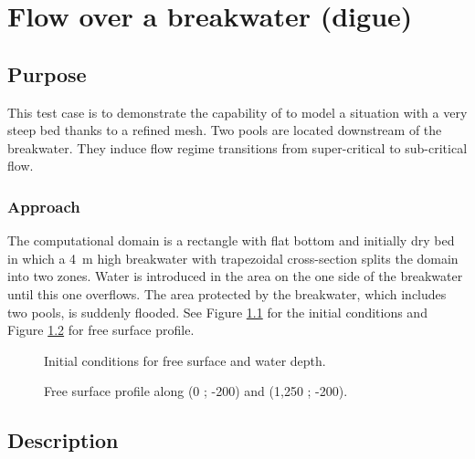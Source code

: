 \chapter{Flow over a breakwater (digue)}

\section{Purpose}

This test case is to demonstrate the capability of 
to model a situation with a very steep bed thanks to a refined 
mesh.
Two pools are located downstream of the breakwater.
They induce flow regime transitions from super-critical to sub-critical flow.

\subsection{Approach}

The computational domain is a rectangle with flat bottom
and initially dry bed in which a 4~m high breakwater
with trapezoidal cross-section splits the domain into two zones.
Water is introduced in the area on the one side of the breakwater
until this one overflows.
The area protected by the breakwater, which includes 
two pools, is suddenly flooded.
See Figure \ref{fig:digue:FSht0} for the initial conditions
and Figure \ref{fig:digue:FSSection} for free surface profile.

\begin{figure}[H]
\begin{minipage}[t]{0.5\textwidth}
 \centering
\end{minipage}
\begin{minipage}[t]{0.5\textwidth}
 \centering
\end{minipage}
\caption{Initial conditions for free surface and water depth.}
\label{fig:digue:FSht0}
\end{figure}

\begin{figure}[H]
\centering
{}
\caption{Free surface profile along (0 ; -200) and (1,250 ; -200).}
\label{fig:digue:FSSection}
\end{figure}

\section{Description}

